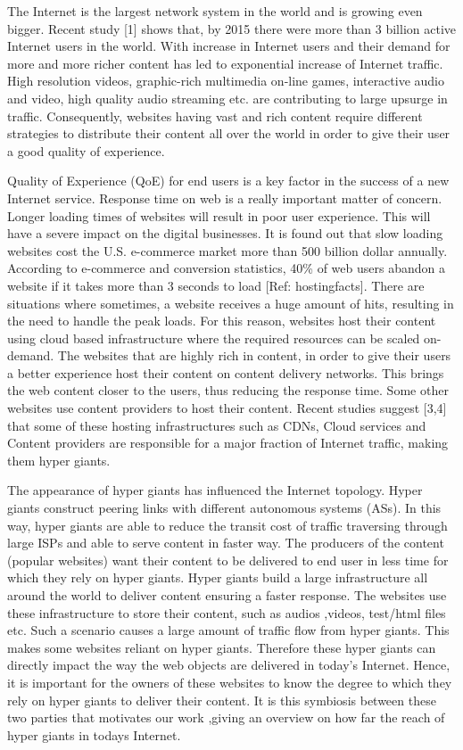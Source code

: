 The Internet is the largest network system in the world and is growing even bigger. Recent study [1] shows that, by 2015 there were more than 3 billion active Internet users in the world. With increase in Internet users and their demand for more and more richer content has led to exponential increase of Internet traffic. High resolution videos, graphic-rich multimedia on-line games, interactive audio and video, high quality audio streaming etc. are contributing to large upsurge in traffic. Consequently, websites having vast and rich content require different strategies to distribute their content all over the world in order to give their user a good quality of experience.

Quality of Experience (QoE) for end users is a key factor in the success of a new Internet service. Response time on web is a really important matter of concern. Longer loading times of websites will result in poor user experience. This will have a severe impact on the digital businesses. It is found out that slow loading websites cost the U.S. e-commerce market more than 500 billion dollar annually. According to e-commerce and conversion statistics, 40\% of web users abandon a website if it takes more than 3 seconds to load [Ref: hostingfacts]. There are situations where sometimes, a website receives a huge amount of hits, resulting in the need to handle the peak loads. For this reason, websites host their content using cloud based infrastructure where the required resources can be scaled on-demand. The websites that are highly rich in content, in order to give their users a better experience host their content on content delivery networks. This brings the web content closer to the users, thus reducing the response time. Some other websites use content providers  to host their content. Recent studies suggest [3,4] that some of these hosting infrastructures such as CDNs, Cloud services and Content providers are responsible for a major fraction of Internet traffic, making them hyper giants.

The appearance of hyper giants has influenced the Internet topology. Hyper giants construct peering links with different autonomous systems (ASs). In this way, hyper giants are able to reduce the transit cost of traffic traversing through large ISPs and able to serve content in faster way. The producers of the content (popular websites) want their content to be delivered to end user in less time for which they rely on hyper giants. Hyper giants build a large infrastructure all around the world to deliver content ensuring a faster response. The websites use these infrastructure to store their content, such as audios ,videos, test/html files etc. Such a scenario causes a large amount of traffic flow from hyper giants. This makes some websites reliant on hyper giants. Therefore these hyper giants can directly impact the way the web objects are delivered in today's Internet. Hence, it is important for the owners of these websites to know the degree to which they rely on hyper giants to deliver their content. It is this symbiosis between these two parties that motivates our work ,giving an overview on how far the reach of hyper giants in todays Internet.

